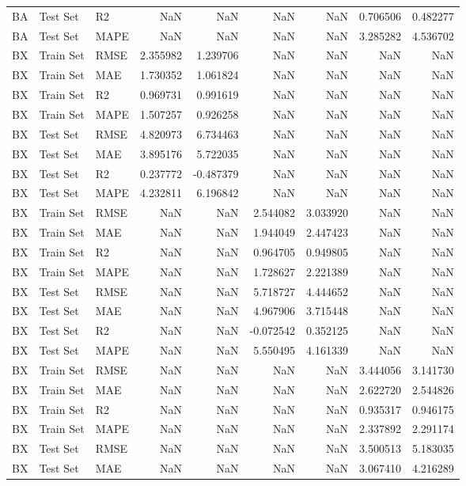 \begin{tabular}{lllrrrrrr}
BA & Test Set & R2 & NaN & NaN & NaN & NaN & 0.706506 & 0.482277 \\
BA & Test Set & MAPE & NaN & NaN & NaN & NaN & 3.285282 & 4.536702 \\
BX & Train Set & RMSE & 2.355982 & 1.239706 & NaN & NaN & NaN & NaN \\
BX & Train Set & MAE & 1.730352 & 1.061824 & NaN & NaN & NaN & NaN \\
BX & Train Set & R2 & 0.969731 & 0.991619 & NaN & NaN & NaN & NaN \\
BX & Train Set & MAPE & 1.507257 & 0.926258 & NaN & NaN & NaN & NaN \\
BX & Test Set & RMSE & 4.820973 & 6.734463 & NaN & NaN & NaN & NaN \\
BX & Test Set & MAE & 3.895176 & 5.722035 & NaN & NaN & NaN & NaN \\
BX & Test Set & R2 & 0.237772 & -0.487379 & NaN & NaN & NaN & NaN \\
BX & Test Set & MAPE & 4.232811 & 6.196842 & NaN & NaN & NaN & NaN \\
BX & Train Set & RMSE & NaN & NaN & 2.544082 & 3.033920 & NaN & NaN \\
BX & Train Set & MAE & NaN & NaN & 1.944049 & 2.447423 & NaN & NaN \\
BX & Train Set & R2 & NaN & NaN & 0.964705 & 0.949805 & NaN & NaN \\
BX & Train Set & MAPE & NaN & NaN & 1.728627 & 2.221389 & NaN & NaN \\
BX & Test Set & RMSE & NaN & NaN & 5.718727 & 4.444652 & NaN & NaN \\
BX & Test Set & MAE & NaN & NaN & 4.967906 & 3.715448 & NaN & NaN \\
BX & Test Set & R2 & NaN & NaN & -0.072542 & 0.352125 & NaN & NaN \\
BX & Test Set & MAPE & NaN & NaN & 5.550495 & 4.161339 & NaN & NaN \\
BX & Train Set & RMSE & NaN & NaN & NaN & NaN & 3.444056 & 3.141730 \\
BX & Train Set & MAE & NaN & NaN & NaN & NaN & 2.622720 & 2.544826 \\
BX & Train Set & R2 & NaN & NaN & NaN & NaN & 0.935317 & 0.946175 \\
BX & Train Set & MAPE & NaN & NaN & NaN & NaN & 2.337892 & 2.291174 \\
BX & Test Set & RMSE & NaN & NaN & NaN & NaN & 3.500513 & 5.183035 \\
BX & Test Set & MAE & NaN & NaN & NaN & NaN & 3.067410 & 4.216289 \\

\end{tabular}

